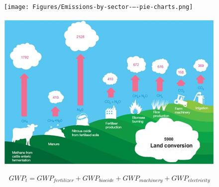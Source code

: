\subsubsection{\bab}

\begin{frame}{\ba}{\bab}
  \begin{figure}
    \centering
    \texttt{[image: Figures/Emissions-by-sector-–-pie-charts.png]}
  \end{figure} 
\end{frame}


\begin{frame}{\ba}{\bab}
  \begin{figure}
    \centering
    \includegraphics[width=.6\textwidth]{Figures/GHG-emissions-from-agricultural-sector-by-practices-in-Mt-CO2-e}
  \end{figure}
  \begin{equation}
    GWP_{t}=GWP_{fertilizer}+GWP_{biocide}+GWP_{machinery}+GWP_{electricity}  
    \end{equation}
\end{frame}

